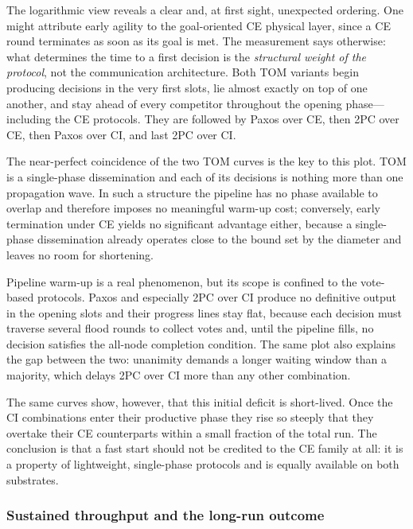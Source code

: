 \documentclass[journal]{IEEEtran}
\newcommand{\CI}{CI}                      %
\newcommand{\CE}{CE}                      %
\begin{document}
The logarithmic view reveals a clear and, at first sight, unexpected
ordering. One might attribute early agility to the goal-oriented \CE{}
physical layer, since a \CE{} round terminates as soon as its goal is met.
The measurement says otherwise: what determines the time to a first
decision is the \emph{structural weight of the protocol}, not the
communication architecture. Both TOM variants begin producing decisions in
the very first slots, lie almost exactly on top of one another, and stay
ahead of every competitor throughout the opening phase---including the
\CE{} protocols. They are followed by Paxos over \CE, then 2PC over \CE,
then Paxos over \CI, and last 2PC over \CI.

The near-perfect coincidence of the two TOM curves is the key to this
plot. TOM is a single-phase dissemination and each of its decisions is
nothing more than one propagation wave. In such a structure the pipeline
has no phase available to overlap and therefore imposes no meaningful
warm-up cost; conversely, early termination under \CE{} yields no
significant advantage either, because a single-phase dissemination already
operates close to the bound set by the diameter and leaves no room for
shortening.

Pipeline warm-up is a real phenomenon, but its scope is confined to the
vote-based protocols. Paxos and especially 2PC over \CI{} produce no
definitive output in the opening slots and their progress lines stay flat,
because each decision must traverse several flood rounds to collect votes
and, until the pipeline fills, no decision satisfies the all-node
completion condition. The same plot also explains the gap between the two:
unanimity demands a longer waiting window than a majority, which delays
2PC over \CI{} more than any other combination.

The same curves show, however, that this initial deficit is short-lived.
Once the \CI{} combinations enter their productive phase they rise so
steeply that they overtake their \CE{} counterparts within a small
fraction of the total run. The conclusion is that a fast start should not
be credited to the \CE{} family at all: it is a property of lightweight,
single-phase protocols and is equally available on both substrates.

\subsubsection{Sustained throughput and the long-run outcome}

\end{document}
